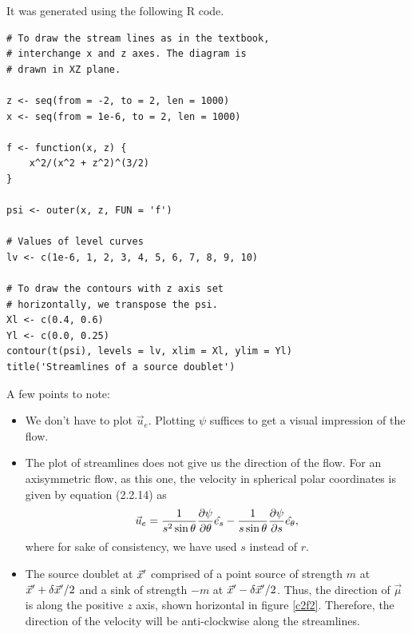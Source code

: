 \begin{itemize}
It was generated using the following R code.
\begin{verbatim}
# To draw the stream lines as in the textbook, 
# interchange x and z axes. The diagram is 
# drawn in XZ plane.

z <- seq(from = -2, to = 2, len = 1000)
x <- seq(from = 1e-6, to = 2, len = 1000)

f <- function(x, z) {
	x^2/(x^2 + z^2)^(3/2)
}

psi <- outer(x, z, FUN = 'f')

# Values of level curves
lv <- c(1e-6, 1, 2, 3, 4, 5, 6, 7, 8, 9, 10) 

# To draw the contours with z axis set 
# horizontally, we transpose the psi.
Xl <- c(0.4, 0.6)
Yl <- c(0.0, 0.25)
contour(t(psi), levels = lv, xlim = Xl, ylim = Yl)
title('Streamlines of a source doublet')
\end{verbatim}
A few points to note:
\begin{itemize}
\item We don't have to plot $\vec{u}_e$. Plotting $\psi$ suffices to get a visual impression of the flow.
\item The plot of streamlines does not give us the direction of the flow. For an axisymmetric flow, as this one, the velocity in spherical polar coordinates is given by equation (2.2.14)
as
\[
\vec{u}_e = \frac{1}{s^2\sin\theta}\frac{\partial{\psi}}{\partial{\theta}}\hat{e_{s}} - \frac{1}{s\sin\theta}\frac{\partial{\psi}}{\partial{s}}\hat{e_{\theta}},
\]
where for sake of consistency, we have used $s$ instead of $r$.
\item The source doublet at $\vec{x}^\prime$ comprised of a point source of strength $m$ at $\vec{x}^\prime + \delta\vec{x}^\prime/2$ and a sink of strength $-m$ at 
$\vec{x}^\prime - \delta\vec{x}^\prime/2$. Thus, the direction of $\vec{\mu}$ is along the positive $z$ axis, shown horizontal in figure \ref{c2f2}. Therefore, the direction of the velocity
will be anti-clockwise along the streamlines.
\end{itemize}


\end{itemize}
